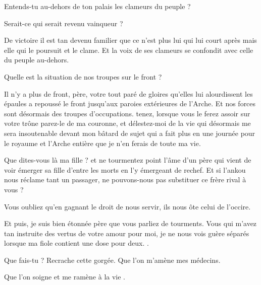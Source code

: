 \begin{drama}
  \elaspeaks Entends-tu au-dehors de ton palais les clameurs du peuple ?

  \roispeaks Serait-ce \elena qui serait revenu vainqueur ?

  \elaspeaks De victoire il est tan devenu familier que ce n’est plus lui qui lui court après mais elle qui le poursuit et le clame. Et la voix de ses clameurs se confondit avec celle du peuple au-dehors.

  \roispeaks Quelle est la situation de nos troupes sur le front ?

  \elaspeaks Il n’y a plus de front, père, votre \elena tout paré de gloires qu’elles lui alourdissent les épaules a repoussé le front jusqu’aux paroies extérieures de l’Arche. Et nos forces sont désormais des troupes d’occupations.  tenez, lorsque vous le ferez assoir sur votre trône parez-le de ma couronne, et délestez-moi de la vie qui désormais me sera insoutenable devant mon bâtard de sujet qui a fait plus en une journée pour le royaume et l’Arche entière que je n’en ferais de toute ma vie.

  \roispeaks Que dites-vous là ma fille ? et ne tourmentez point l’âme d’un père qui vient de voir émerger sa fille d’entre les morts en l’y émergeant de rechef. Et si l’ankou nous réclame tant un passager, ne pouvons-nous pas substituer ce frère rival à vous ?

  \elaspeaks Vous oubliez qu’en gagnant le droit de nous servir, ils nous ôte celui de l’occire.

  Et puis, je suis bien étonnée père que vous parliez de tourments. Vous qui m’avez tan instruite des vertus de votre amour pour moi, je ne nous vois guère séparés lorsque ma fiole contient une dose pour deux. .

  \roispeaks Que fais-tu \princesse{} ? Recrache cette gorgée.  Que l’on m’amène mes médecins.


  \roispeaks Que l’on soigne et me ramène à la vie \princesse.





\end{drama}
